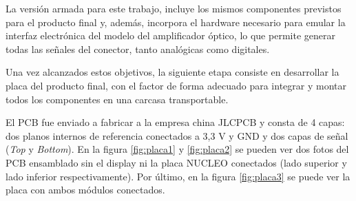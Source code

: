 La versión armada para este trabajo, incluye los mismos componentes previstos para el producto final y, además, incorpora el hardware necesario para emular la interfaz electrónica del modelo del amplificador óptico, lo que permite generar todas las señales del conector, tanto analógicas como digitales.

Una vez alcanzados estos objetivos, la siguiente etapa consiste en desarrollar la placa del producto final, con el factor de forma adecuado para integrar y montar todos los componentes en una carcasa transportable. 

El PCB fue enviado a fabricar a la empresa china JLCPCB y consta de 4 capas: dos planos internos de referencia conectados a 3,3 V y GND y dos capas de señal (\textit{Top} y \textit{Bottom}). En la figura \ref{fig:placa1} y \ref{fig:placa2} se pueden ver dos fotos del PCB ensamblado sin el display ni la placa NUCLEO conectados (lado superior y lado inferior respectivamente). Por último, en la figura \ref{fig:placa3} se puede ver la placa con ambos módulos conectados.


